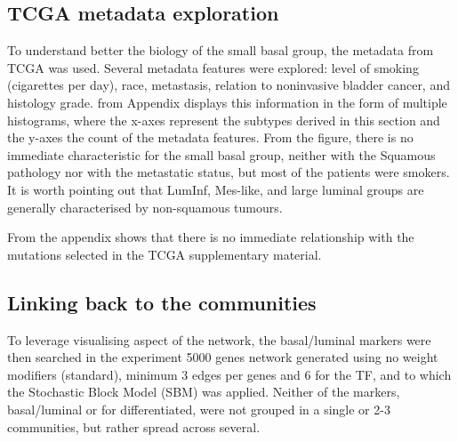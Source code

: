 \newpage

\subsection{TCGA metadata exploration} \label{s:N_I:sel_tfs_metadata}

To understand better the biology of the small basal group, the metadata from TCGA \citep{Cancer_Genome_Atlas_Research_Network2014-xp} was used. Several metadata features were explored: level of smoking (cigarettes per day), race, metastasis, relation to noninvasive bladder cancer, and histology grade.  from Appendix displays this information in the form of multiple histograms, where the x-axes represent the subtypes derived in this section and the y-axes the count of the metadata features. From the figure, there is no immediate characteristic for the small basal group, neither with the Squamous pathology nor with the metastatic status, but most of the patients were smokers. It is worth pointing out that LumInf, Mes-like, and large luminal groups are generally characterised by non-squamous tumours. 

From the appendix  shows that there is no immediate relationship with the mutations selected in the TCGA supplementary material.


\subsection{Linking back to the communities} \label{s:N_I:sel_tfs_net}

To leverage visualising aspect of the network, the basal/luminal markers were then searched in the experiment 5000 genes network generated using no weight modifiers (standard), minimum 3 edges per genes and 6 for the TF, and to which the Stochastic Block Model (SBM) was applied. Neither of the markers, basal/luminal or for differentiated, were not grouped in a single or 2-3 communities, but rather spread across several.



